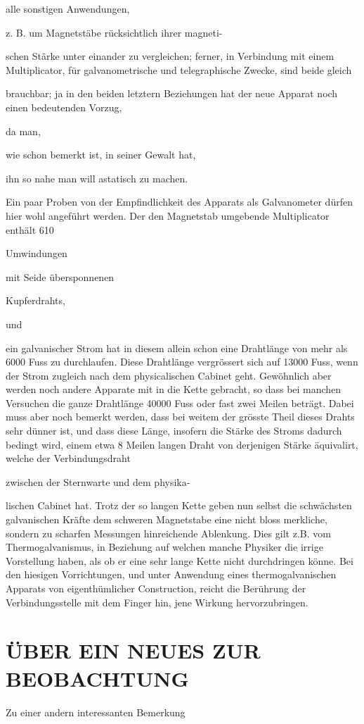 \documentclass[12pt,a4paper]{article}
\begin{document}
alle sonstigen Anwendungen,

z. B. um Magnetstäbe rücksichtlich ihrer magneti-

schen Stärke unter einander zu vergleichen; ferner, in Verbindung mit einem Multiplicator, für galvanometrische und telegraphische Zwecke, sind beide gleich

brauchbar; ja in den beiden letztern Beziehungen hat der neue Apparat noch einen bedeutenden Vorzug,

da man,

wie schon bemerkt ist, in seiner Gewalt hat,

ihn so nahe man will astatisch zu machen.

Ein paar Proben von der Empfindlichkeit des Apparats als Galvanometer dürfen hier wohl angeführt werden. Der den Magnetstab umgebende Multiplicator enthält 610

Umwindungen

mit Seide übersponnenen

Kupferdrahts,

und

ein galvanischer Strom hat in diesem allein schon eine Drahtlänge von mehr als 6000 Fuss zu durchlaufen. Diese Drahtlänge vergrössert sich auf 13000 Fuss, wenn der Strom zugleich nach dem physicalischen Cabinet geht. Gewöhnlich aber werden noch andere Apparate mit in die Kette gebracht, so dass bei manchen Versuchen die ganze Drahtlänge 40000 Fuss oder fast zwei Meilen beträgt. Dabei muss aber noch bemerkt werden, dass bei weitem der grösste Theil dieses Drahts sehr dünner ist, und dass diese Länge, insofern die Stärke des Stroms dadurch bedingt wird, einem etwa 8 Meilen langen Draht von derjenigen Stärke äquivalirt, welche der Verbindungsdraht

zwischen der Sternwarte und dem physika-

lischen Cabinet hat. Trotz der so langen Kette geben nun selbst die schwächsten galvanischen Kräfte dem schweren Magnetstabe eine nicht bloss merkliche, sondern zu scharfen Messungen hinreichende Ablenkung. Dies gilt z.B. vom Thermogalvanismus, in Beziehung auf welchen manche Physiker die irrige Vorstellung haben, als ob er eine sehr lange Kette nicht durchdringen könne. Bei den hiesigen Vorrichtungen, und unter Anwendung eines thermogalvanischen Apparats von eigenthümlicher Construction, reicht die Berührung der Verbindungsstelle mit dem Finger hin, jene Wirkung hervorzubringen.

\section*{ÜBER EIN NEUES ZUR BEOBACHTUNG}
Zu einer andern interessanten Bemerkung
\end{document}
